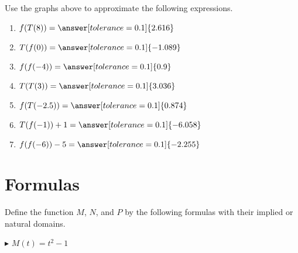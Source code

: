 \documentclass{ximera}
\begin{document}
\begin{question}


Use the graphs above to approximate the following expressions.



\begin{enumerate}

\item $f(T(8)) = \answer[tolerance=0.1]{2.616}$ \\

\item $T(f(0)) = \answer[tolerance=0.1]{-1.089}$ \\

\item $f(f(-4)) = \answer[tolerance=0.1]{0.9}$ \\

\item $T(T(3)) = \answer[tolerance=0.1]{3.036}$ \\

\item $f(T(-2.5)) = \answer[tolerance=0.1]{0.874}$ \\

\item $T(f(-1))+1 = \answer[tolerance=0.1]{-6.058}$ \\

\item $f(f(-6)) -5 = \answer[tolerance=0.1]{-2.255}$ \\

\end{enumerate}



\end{question}

















\section{Formulas}


Define the function $M$, $N$, and $P$ by the following formulas with their implied or natural domains.

$\blacktriangleright$  $M(t) = t^2 - 1$ \\
\end{document}
